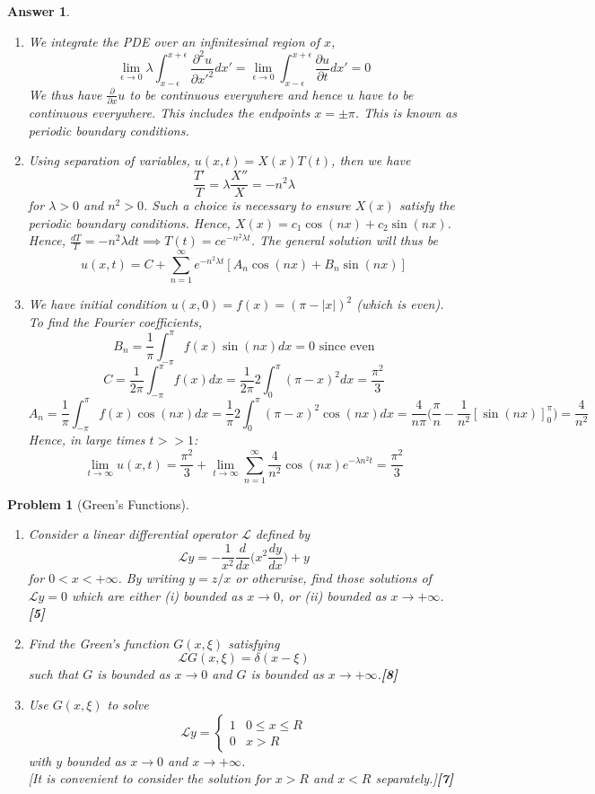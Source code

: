 \documentclass[a4paper]{article}
\newtheorem{ans}{Answer}[section]
\theoremstyle{new}
\newtheorem{qns}{Problem}[section]
\begin{document}
\begin{ans}\leavevmode
\begin{enumerate}[label=(\alph*)]
    \item We integrate the PDE over an infinitesimal region of $x$,
$$\lim_{\epsilon\rightarrow0}\lambda\int_{x-\epsilon}^{x+\epsilon}\frac{\partial^2u}{\partial x'^2}dx'=\lim_{\epsilon\rightarrow0}\int_{x-\epsilon}^{x+\epsilon}\frac{\partial u}{\partial t}dx'=0$$
We thus have $\frac{\partial}{\partial x}u$ to be continuous everywhere and hence $u$ have to be continuous everywhere. This includes the endpoints $x=\pm\pi$. This is known as periodic boundary conditions.
\item Using separation of variables, $u(x,t)=X(x)T(t)$, then we have
$$\frac{T'}{T}=\lambda\frac{X''}{X}=-n^2\lambda$$
for $\lambda>0$ and $n^2>0$. Such a choice is necessary to ensure $X(x)$ satisfy the periodic boundary conditions. Hence, $X(x)=c_1\cos(n x)+c_2\sin(n x)$. Hence, $\frac{dT}{T}=-n^2\lambda dt\implies T(t)=ce^{-n^2\lambda t}$. The general solution will thus be
$$u(x,t)=C+\sum_{n=1}^\infty e^{-n^2\lambda t}[A_n\cos(nx)+B_n\sin(nx)]$$
\item We have initial condition $u(x,0)=f(x)=(\pi-|x|)^2$ (which is even). To find the Fourier coefficients,
$$B_n=\frac{1}{\pi}\int_{-\pi}^\pi f(x)\sin(nx)dx=0\text{ since even}$$
$$C=\frac{1}{2\pi}\int_{-\pi}^\pi f(x)dx=\frac{1}{2\pi}2\int_0^\pi(\pi-x)^2dx=\frac{\pi^2}{3}$$
$$A_n=\frac{1}{\pi}\int_{-\pi}^\pi f(x)\cos(nx)dx=\frac{1}{\pi}2\int_0^\pi(\pi-x)^2\cos(nx)dx=\frac{4}{n\pi}\bigg(\frac{\pi}{n}-\frac{1}{n^2}[\sin(nx)]^\pi_0\bigg)=\frac{4}{n^2}$$
Hence, in large times $t>>1$:
$$\lim_{t\rightarrow\infty}u(x,t)=\frac{\pi^2}{3}+\lim_{t\rightarrow\infty}\sum_{n=1}^\infty\frac{4}{n^2}\cos(nx)e^{-\lambda n^2t}=\frac{\pi^2}{3}$$
\end{enumerate}
\end{ans}
\newpage
\begin{qns}[Green's Functions]\leavevmode
\begin{enumerate}[label=(\alph*)]
    \item Consider a linear differential operator $\mathcal{L}$ defined by
$$\mathcal{L}y=-\frac{1}{x^2}\frac{d}{dx}\bigg(x^2\frac{dy}{dx}\bigg)+y$$
for $0<x<+\infty$. By writing $y=z/x$ or otherwise, find those solutions of $\mathcal{L}y=0$ which are either (i) bounded as $x\rightarrow0$, or (ii) bounded as $x\rightarrow+\infty$.\hfill \textbf{[5]}
\item Find the Green's function $G(x,\xi)$ satisfying
$$\mathcal{L}G(x,\xi)=\delta(x-\xi)$$
such that $G$ is bounded as $x\rightarrow0$ and $G$ is bounded as $x\rightarrow+\infty$.\hfill \textbf{[8]}
\item  Use $G(x,\xi)$ to solve
$$\mathcal{L}y=
\left\{
        \begin{array}{ll}
      1 & 0\leq x\leq R \\
      0 & x>R
        \end{array}
    \right.$$
with $y$ bounded as $x\rightarrow0$ and $x\rightarrow+\infty$.\\[5pt]
[It is convenient to consider the solution for $x>R$ and $x<R$ separately.]\hfill \textbf{[7]}
\end{enumerate}
\end{qns}
\end{document}
